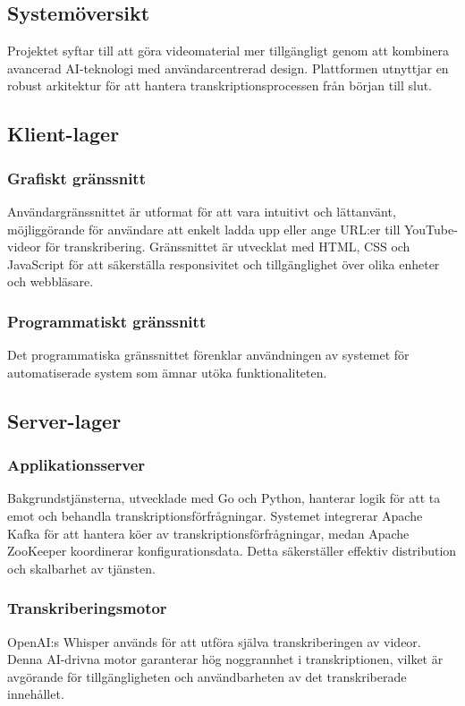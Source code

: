 \subsection{Systemöversikt}
Projektet syftar till att göra videomaterial mer tillgängligt genom att
kombinera avancerad AI-teknologi med användarcentrerad design. Plattformen
utnyttjar en robust arkitektur för att hantera transkriptionsprocessen från
början till slut.

\subsection{Klient-lager}

\subsubsection{Grafiskt gränssnitt}
Användargränssnittet är utformat för att vara intuitivt och lättanvänt,
möjliggörande för användare att enkelt ladda upp eller ange URL:er till
YouTube-videor för transkribering. Gränssnittet är utvecklat med HTML, CSS och
JavaScript för att säkerställa responsivitet och tillgänglighet över olika
enheter och webbläsare.

\subsubsection{Programmatiskt gränssnitt}
Det programmatiska gränssnittet förenklar användningen av systemet för
automatiserade system som ämnar utöka funktionaliteten. 

\subsection{Server-lager}

\subsubsection{Applikationsserver}
Bakgrundstjänsterna, utvecklade med Go och Python,
hanterar logik för att ta emot och behandla transkriptionsförfrågningar.
Systemet integrerar Apache Kafka för att hantera köer av
transkriptionsförfrågningar, medan Apache ZooKeeper koordinerar
konfigurationsdata. Detta säkerställer effektiv distribution och skalbarhet av
tjänsten.
\subsubsection{Transkriberingsmotor} OpenAI:s Whisper används för att utföra själva
transkriberingen av videor. Denna AI-drivna motor garanterar hög noggrannhet i
transkriptionen, vilket är avgörande för tillgängligheten och användbarheten
av det transkriberade innehållet.

